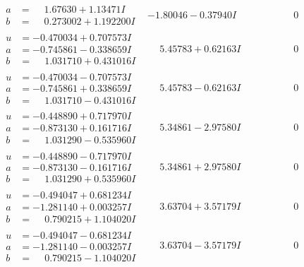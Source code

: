 \documentclass[1p]{elsarticle_modified}
\theoremstyle{definition}
\begin{document}
$$\begin{array}{c|c|c}
\begin{aligned}
a &= \phantom{-}1.67630 + 1.13471 I \\
b &= \phantom{-}0.273002 + 1.192200 I\end{aligned}
 & -1.80046 - 0.37940 I & \phantom{-0.000000 } 0 \\ \hline\begin{aligned}
u &= -0.470034 + 0.707573 I \\
a &= -0.745861 - 0.338659 I \\
b &= \phantom{-}1.031710 + 0.431016 I\end{aligned}
 & \phantom{-}5.45783 + 0.62163 I & \phantom{-0.000000 } 0 \\ \hline\begin{aligned}
u &= -0.470034 - 0.707573 I \\
a &= -0.745861 + 0.338659 I \\
b &= \phantom{-}1.031710 - 0.431016 I\end{aligned}
 & \phantom{-}5.45783 - 0.62163 I & \phantom{-0.000000 } 0 \\ \hline\begin{aligned}
u &= -0.448890 + 0.717970 I \\
a &= -0.873130 + 0.161716 I \\
b &= \phantom{-}1.031290 - 0.535960 I\end{aligned}
 & \phantom{-}5.34861 - 2.97580 I & \phantom{-0.000000 } 0 \\ \hline\begin{aligned}
u &= -0.448890 - 0.717970 I \\
a &= -0.873130 - 0.161716 I \\
b &= \phantom{-}1.031290 + 0.535960 I\end{aligned}
 & \phantom{-}5.34861 + 2.97580 I & \phantom{-0.000000 } 0 \\ \hline\begin{aligned}
u &= -0.494047 + 0.681234 I \\
a &= -1.281140 + 0.003257 I \\
b &= \phantom{-}0.790215 + 1.104020 I\end{aligned}
 & \phantom{-}3.63704 + 3.57179 I & \phantom{-0.000000 } 0 \\ \hline\begin{aligned}
u &= -0.494047 - 0.681234 I \\
a &= -1.281140 - 0.003257 I \\
b &= \phantom{-}0.790215 - 1.104020 I\end{aligned}
 & \phantom{-}3.63704 - 3.57179 I & \phantom{-0.000000 } 0\\

\end{array}$$
\end{document}
